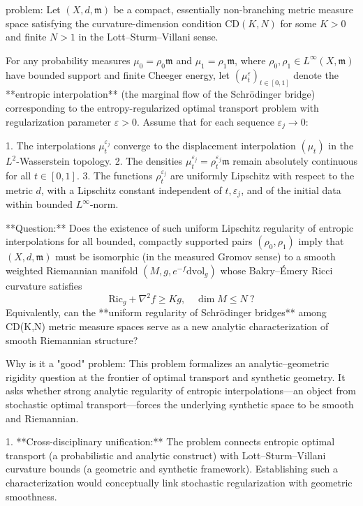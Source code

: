 problem:  
Let \((X,d,\mathfrak{m})\) be a compact, essentially non-branching metric measure space satisfying the curvature-dimension condition \(\mathrm{CD}(K,N)\) for some \(K>0\) and finite \(N>1\) in the Lott–Sturm–Villani sense.  

For any probability measures \(\mu_0 = \rho_0 \mathfrak{m}\) and \(\mu_1 = \rho_1 \mathfrak{m}\), where \(\rho_0,\rho_1 \in L^\infty(X,\mathfrak{m})\) have bounded support and finite Cheeger energy, let \((\mu_t^{\varepsilon})_{t\in[0,1]}\) denote the **entropic interpolation** (the marginal flow of the Schrödinger bridge) corresponding to the entropy-regularized optimal transport problem with regularization parameter \(\varepsilon > 0\). Assume that for each sequence \(\varepsilon_j \to 0\):  

1. The interpolations \(\mu_t^{\varepsilon_j}\) converge to the displacement interpolation \((\mu_t)\) in the \(L^2\)-Wasserstein topology.  
2. The densities \(\mu_t^{\varepsilon_j} = \rho_t^{\varepsilon_j} \mathfrak{m}\) remain absolutely continuous for all \(t\in[0,1]\).  
3. The functions \(\rho_t^{\varepsilon_j}\) are uniformly Lipschitz with respect to the metric \(d\), with a Lipschitz constant independent of \(t,\varepsilon_j\), and of the initial data within bounded \(L^\infty\)-norm.  

**Question:**  
Does the existence of such uniform Lipschitz regularity of entropic interpolations for all bounded, compactly supported pairs \((\rho_0,\rho_1)\) imply that \((X,d,\mathfrak{m})\) must be isomorphic (in the measured Gromov sense) to a smooth weighted Riemannian manifold \((M,g,e^{-f}\mathrm{dvol}_g)\) whose Bakry–Émery Ricci curvature satisfies  
\[
\mathrm{Ric}_g + \nabla^2 f \ge K g, \quad \dim M \le N\ ?
\]  
Equivalently, can the **uniform regularity of Schrödinger bridges** among CD(K,N) metric measure spaces serve as a new analytic characterization of smooth Riemannian structure?  

Why is it a "good" problem:  
This problem formalizes an analytic–geometric rigidity question at the frontier of optimal transport and synthetic geometry. It asks whether strong analytic regularity of entropic interpolations—an object from stochastic optimal transport—forces the underlying synthetic space to be smooth and Riemannian.  

1. **Cross-disciplinary unification:**  
   The problem connects entropic optimal transport (a probabilistic and analytic construct) with Lott–Sturm–Villani curvature bounds (a geometric and synthetic framework). Establishing such a characterization would conceptually link stochastic regularization with geometric smoothness.  


